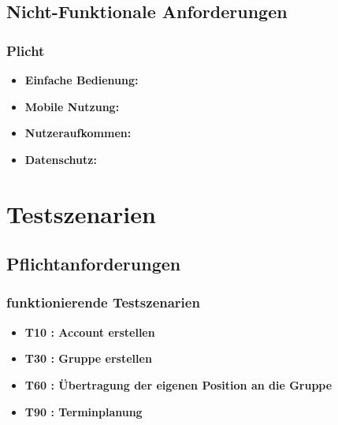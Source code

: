 \documentclass[parskip=full,11pt]{scrartcl}
\begin{document}
	\subsection{Nicht-Funktionale Anforderungen}
		\subsubsection{Plicht}
			\begin{itemize}
                \item \textbf{Einfache Bedienung:}\\
                \item \textbf{Mobile Nutzung:}\\
                \item \textbf{Nutzeraufkommen:}\\
                \item \textbf{Datenschutz:}\\
			\end{itemize}

\section{Testszenarien}

	\subsection{Pflichtanforderungen}
		\subsubsection{funktionierende Testszenarien}
			\begin{itemize}
				\item \textbf{T10 : Account erstellen}
				\item \textbf{T30 : Gruppe erstellen}
				\item \textbf{T60 : Übertragung der eigenen Position an die Gruppe}
				\item \textbf{T90 : Terminplanung}
			\end{itemize}
\end{document}
